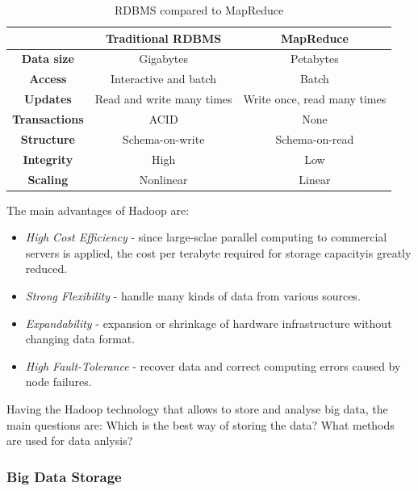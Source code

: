 \begin{table}[!ht]
\begin{center}
\caption{RDBMS compared to MapReduce \cite{tableHadoop}}
\begin{tabular}{| c | c | c |}
\hline
  & \textbf{Traditional RDBMS} & \textbf{MapReduce} \\
\hline
 \textbf{Data size}& Gigabytes & Petabytes \\
\hline
 \textbf{Access}& Interactive and batch & Batch \\
\hline
\textbf{Updates} & Read and write many times & Write once, read many times \\
\hline
\textbf{Transactions} & ACID & None \\
\hline
\textbf{Structure} & Schema-on-write & Schema-on-read \\
\hline
\textbf{Integrity} & High & Low \\
\hline
\textbf{Scaling} & Nonlinear & Linear \\
\hline
\end{tabular}
\label{table:mrdiff}
\vspace{-2.5em}
\end{center}
\end{table}

The main advantages of Hadoop are:
\begin{itemize}

 \item \textit{High Cost Efficiency} - since large-sclae parallel computing to commercial servers is applied, the cost per terabyte required for storage capacityis greatly reduced.

 \item \textit{Strong Flexibility} - handle many kinds of data from various sources.

 \item \textit{Expandability} - expansion or shrinkage of hardware infrastructure without changing data format.

 \item \textit{High Fault-Tolerance} - recover data and correct computing errors caused by node failures.

\end{itemize}

Having the Hadoop technology that allows to store and analyse big data, the main questions are: Which is the best way of storing the data? What methods are used for data anlysis? 

\subsubsection{Big Data Storage}

